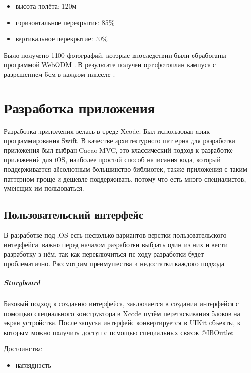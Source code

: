       \begin{itemize}
        \item высота полёта: 120м
        \item горизонтальное перекрытие: 85\%
        \item вертикальное перекрытие: 70\%
      \end{itemize}

      Было получено 1100 фотографий, которые впоследствии были обработаны программой WebODM \cite{WebODM}. В результате получен ортофотоплан кампуса с разрешением 5см в каждом пикселе .


\chapter{Разработка приложения}
  Разработка приложения велась в среде Xcode. Был использован язык программирования Swift. В качестве архитектурного паттерна для разработки приложения был выбран Cacao MVC, это классический подход к разработке приложений для iOS, наиболее простой способ написания кода, который поддерживается абсолютным большинство библиотек, также приложения с таким паттерном проще и дешевле поддерживать, потому что есть много специалистов, умеющих им пользоваться.

  \section{Пользовательский интерфейс}
    В разработке под iOS есть несколько вариантов верстки пользовательского интерфейса, важно перед началом разработки выбрать один из них и вести разработку в нём, так как переключиться по ходу разработки будет проблематично. Рассмотрим преимущества и недостатки каждого подхода

    \paragraph{Storyboard}
      Базовый подход к созданию интерфейса, заключается в создании интерфейса с помощью специального конструктора в Xcode путём перетаскивания блоков на экран устройства. После запуска интерфейс конвертируется в UIKit объекты, к которым можно получить доступ с помощью специальных связок @IBOutlet

      \noindent Достоинства:
      \begin{itemize}
        \item наглядность
      \end{itemize}

